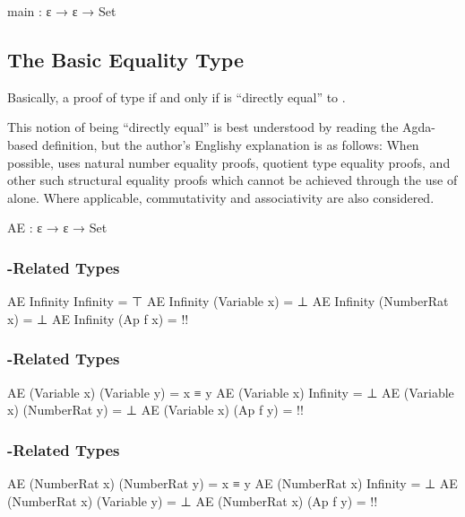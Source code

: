 \documentclass{report}
\begin{document}
\begin{code}
  main : ε → ε → Set
\end{code}

\subsection{The Basic Equality Type}
Basically, a proof of type    if and only if  is ``directly equal'' to .

This notion of being ``directly equal'' is best understood by reading the Agda-based definition, but the author's Englishy explanation is as follows: When possible,  uses natural number equality proofs, quotient type equality proofs, and other such structural equality proofs which cannot be achieved through the use of  alone.  Where applicable, commutativity and associativity are also considered.

\begin{code}
  AE : ε → ε → Set
\end{code}

\subsubsection{-Related Types}

\begin{code}
  AE Infinity Infinity = ⊤
  AE Infinity (Variable x) = ⊥
  AE Infinity (NumberRat x) = ⊥
  AE Infinity (Ap f x) = {!!}
\end{code}

\subsubsection{-Related Types}

\begin{code}
  AE (Variable x) (Variable y) = x ≡ y
  AE (Variable x) Infinity = ⊥
  AE (Variable x) (NumberRat y) = ⊥
  AE (Variable x) (Ap f y) = {!!}
\end{code}

\subsubsection{-Related Types}

\begin{code}
  AE (NumberRat x) (NumberRat y) = x ≡ y
  AE (NumberRat x) Infinity = ⊥
  AE (NumberRat x) (Variable y) = ⊥
  AE (NumberRat x) (Ap f y) = {!!}
\end{code}
\end{document}
